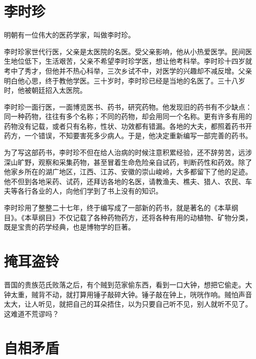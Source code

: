 \documentclass[12pt,UTF-8,openany]{ctexbook}
\begin{document}
\chapter{李时珍}

\begin{large}
    
    明朝有一位伟大的医药学家，叫做李时珍。
    
    李时珍家世代行医，父亲是太医院的名医。受父亲影响，他从小热爱医学。民间医生地位低下，生活艰苦，父亲不希望李时珍学医，想让他考科举。李时珍十四岁就考中了秀才，但他并不热心科举，三次乡试不中，对医学的兴趣却不减反增。父亲明白他心思，终于教他学医。三十岁时，李时珍已经是当地的名医了。三十八岁时，他被朝廷招入太医院。
    
    李时珍一面行医，一面博览医书、药书，研究药物。他发现旧的药书有不少缺点：同一种药物，往往有多个名称；不同的药物，却会用同一个名称。更有许多有用的药物没有记载，或者只有名称，性状、功效都有错漏。各地的大夫，都照着药书开药方，一个错误，不知要害死多少病人。于是，他决定重新编写一部完善的药书。
    
    为了写这部药书，李时珍不但在给人治病的时候注意积累经验，还不辞劳苦，远涉深山旷野，观察和采集药物，甚至冒着生命危险亲自试药，判断药性和药效。除了他家乡所在的湖广地区，江西、江苏、安徽的崇山峻岭，大多都留下了他的足迹。他不但到各地采药、试药，还拜访各地的名医，请教渔夫、樵夫、猎人、农民、车夫等各行各业的人，向他们学到了书上没有的知识。
    
    李时珍用了整整二十七年，终于编写成了一部新的药书，就是著名的《本草纲目》。《本草纲目》不仅记载了各种药物药方，还将各种有用的动植物、矿物分类，既是宝贵的药学经典，也是博物学的巨著。
    
\end{large}



\chapter{掩耳盗铃}

\begin{large}
    
    晋国的贵族范氏败落之后，有个贼到范家偷东西，看到一口大钟，想把它偷走。大钟太重，贼背不动，就打算用锤子敲碎大钟。锤子敲在钟上，咣咣作响。贼怕声音太大，让人听见，就把自己的耳朵捂住，以为只要自己听不见，别人就听不见了。这难道不荒谬吗？
    
\end{large}



\chapter{自相矛盾}
\end{document}
